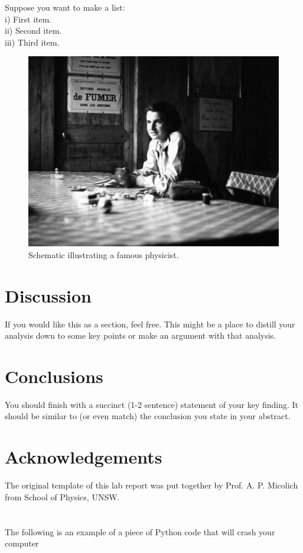 \documentclass[aps,prl,reprint,10pt,amsmath,amssymb,superscriptaddress,a4paper]{revtex4-2}
\begin{document}
\lipsum[5] %

Suppose you want to make a list:\\

\noindent i) First item.\\

\noindent ii) Second item.\\

\noindent iii) Third item.\\

\lipsum[6] %

\lipsum[7] %

\begin{figure}
\includegraphics[width = 8 cm]{physicist}
\caption{Schematic illustrating a famous physicist.}
\end{figure}

\lipsum[8] %

\section{Discussion}

If you would like this as a section, feel free. This might be a place to distill your analysis down to some key points or make an argument with that analysis.\cite{Other:2014ab}

\lipsum[9] %

\lipsum[10] %

\section{Conclusions}

You should finish with a succinct (1-2 sentence) statement of your key finding. It should be similar to (or even match) the conclusion you state in your abstract.

\section{Acknowledgements}

The original template of this lab report was put together by Prof. A. P. Micolich from School of Physics, UNSW.




\newpage
\onecolumngrid
\section{\appendixname}
The following is an example of a piece of Python code that will crash your computer

\end{document}
